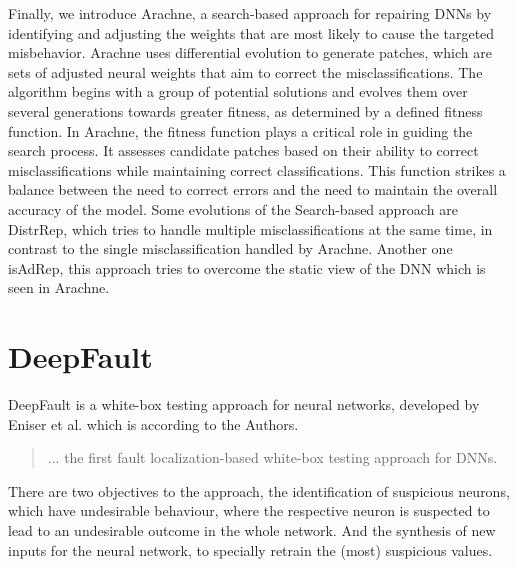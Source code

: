 Finally, we introduce Arachne, a search-based approach for repairing DNNs by identifying and adjusting the weights that are most likely to cause the targeted misbehavior.
Arachne uses differential evolution to generate patches, which are sets of adjusted neural weights that aim to correct the misclassifications.
The algorithm begins with a group of potential solutions and evolves them over several generations towards greater fitness, as determined by a defined fitness function.
In Arachne, the fitness function plays a critical role in guiding the search process.
It assesses candidate patches based on their ability to correct misclassifications while maintaining correct classifications.
This function strikes a balance between the need to correct errors and the need to maintain the overall accuracy of the model.
Some evolutions of the Search-based approach are DistrRep, which tries to handle multiple misclassifications at the same time, in contrast to the single misclassification handled by Arachne.
Another one isAdRep, this approach tries to overcome the static view of the DNN which is seen in Arachne.

\section{DeepFault}\label{sec:deepfault}
DeepFault\cite{eniser_deepfault_2019} is a white-box testing approach for neural networks, developed by Eniser et al. which is according to the Authors.
\begin{quote}
    ... the first fault localization-based white-box testing approach for DNNs.
\end{quote}
There are two objectives to the approach, the identification of suspicious neurons, which have undesirable behaviour, where the respective neuron is suspected to lead to an undesirable outcome in the whole network.
And the synthesis of new inputs for the neural network, to specially retrain the (most) suspicious values.

